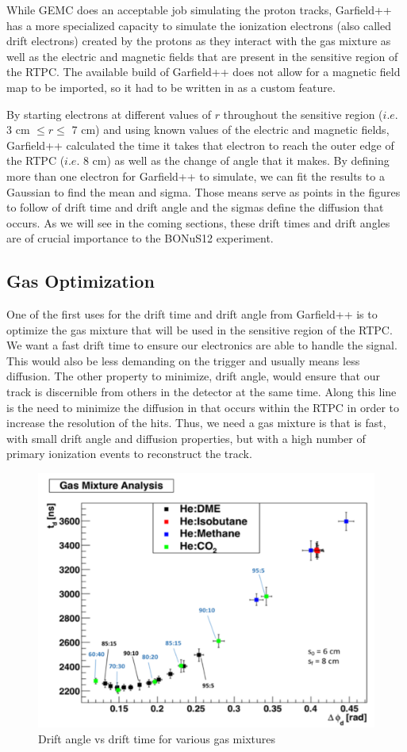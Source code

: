 While GEMC does an acceptable job simulating the proton tracks, Garfield++ has a more specialized capacity to simulate the ionization electrons (also called drift electrons) created by the protons as they interact with the gas mixture as well as the electric and magnetic fields that are present in the sensitive region of the RTPC. The available build of Garfield++ does not allow for a magnetic field map to be imported, so it had to be written in as a custom feature. 

By starting electrons at different values of $r$ throughout the sensitive region ($i.e.$ 3 cm $\leq r \leq$ 7 cm) and using known values of the electric and magnetic fields, Garfield++ calculated the time it takes that electron to reach the outer edge of the RTPC ($i.e.$ 8 cm) as well as the change of angle that it makes. By defining more than one electron for Garfield++ to simulate, we can fit the results to a Gaussian to find the mean and sigma. Those means serve as points in the figures to follow of drift time and drift angle and the sigmas define the diffusion that occurs. As we will see in the coming sections, these drift times and drift angles are of crucial importance to the BONuS12 experiment. 

\subsection{Gas Optimization}
\label{sec:gas_opt}
One of the first uses for the drift time and drift angle from Garfield++ is to optimize the gas mixture that will be used in the sensitive region of the RTPC. We want a fast drift time to ensure our electronics are able to handle the signal. This would also be less demanding on the trigger and usually means less diffusion. The other property to minimize, drift angle, would ensure that our track is discernible from others in the detector at the same time. Along this line is the need to minimize the diffusion in that occurs within the RTPC in order to increase the resolution of the hits. Thus, we need a gas mixture is that is fast, with small drift angle and diffusion properties, but with a high number of primary ionization events to reconstruct the track.

\begin{figure}[h!]
	\centering
	\includegraphics[width=0.8\linewidth]{figures/gas_opt_phi_vs_t.png}
	\caption{Drift angle vs drift time for various gas mixtures}
	\label{fig:gas_opt_phi_vs_t}
\end{figure}

